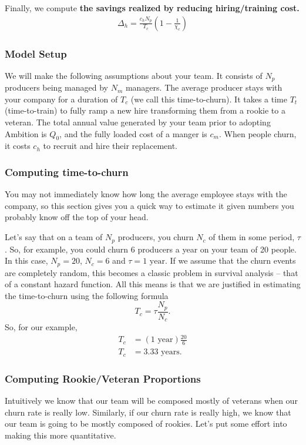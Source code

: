 \documentclass[paper=a4, fontsize=11pt abstract]{scrartcl}
\numberwithin{equation}{section}		%
\numberwithin{figure}{section}			%
\numberwithin{table}{section}				%
\begin{document}
Finally, we compute \textbf{the savings realized by reducing hiring/training cost.}
\begin{align}
    \Delta_h = \frac{c_h N_p}{T_c}\left(1 - \frac{1}{\chi_c}\right)
\end{align}

\subsubsection{Model Setup}
We will make the following assumptions about your team.  It consists of $N_p$ producers being managed by $N_m$ managers.  The average producer stays with your company for a duration of $T_c$ (we call this time-to-churn).  It takes a time $T_t$ (time-to-train) to fully ramp a new hire transforming them from a rookie to a veteran. The total annual value generated by your team prior to adopting Ambition is $Q_0$, and the fully loaded cost of a manger is $c_m$.  When people churn, it costs $c_h$ to recruit and hire their replacement.

\subsubsection{Computing time-to-churn}
You may not immediately know how long the average employee stays with the company, so this section gives you a quick way to estimate it given numbers you probably know off the top of your head.

Let's say that on a team of $N_p$ producers, you churn $N_c$ of them in some period, $\tau$.  So, for example, you could churn 6 producers a year on your team of 20 people.  In this case, $N_p=20$, $N_c=6$ and $\tau=1\text{ year}$. If we assume that the churn events are completely random, this becomes a classic problem in survival analysis -- that of a constant hazard function. All this means is that we are justified in estimating the time-to-churn using the following formula
\begin{equation}
    T_c = \tau \frac{N_p}{N_c}.
\end{equation}
So, for our example,
\begin{align}
    T_c &= \left(\text{1 year}\right)\frac{20}{6} \\
    T_c &= 3.33\text{ years}.
\end{align}

\subsubsection{Computing Rookie/Veteran Proportions}
Intuitively we know that our team will be composed mostly of veterans when our churn rate is really low.  Similarly, if our churn rate is really high, we know that our team is going to be mostly composed of rookies.  Let's put some effort into making this more quantitative.
\end{document}
